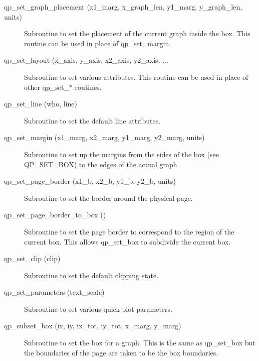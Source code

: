 \begin{description}
\label{r:qp.set.graph.placement}
\item[qp_set_graph_placement (x1_marg, x_graph_len, y1_marg, y_graph_len, units)] \Newline 
Subroutine to set the placement of the current graph inside the box. 
This routine can be used in place of qp_set_margin.

\label{r:qp.set.layout}
\item[qp_set_layout (x_axis, y_axis, x2_axis, y2_axis, ...] \Newline 
     Subroutine to set various attributes. This routine can be used
     in place of other qp_set_* routines.

\label{r:qp.set.line}
\item[qp_set_line (who, line)] \Newline 
     Subroutine to set the default line attributes.

\label{r:qp.set.margin}
\item[qp_set_margin (x1_marg, x2_marg, y1_marg, y2_marg, units)] \Newline 
Subroutine to set up the margins from the sides of the box (see QP_SET_BOX)
to the edges of the actual graph.

\label{r:qp.set.page.border}
\item[qp_set_page_border (x1_b, x2_b, y1_b, y2_b, units)] \Newline 
     Subroutine to set the border around the physical page.

\label{r:qp.set.page.border.to.box}
\item[qp_set_page_border_to_box ()] \Newline 
Subroutine to set the page border to correspond to the region of the
current box. This allows qp_set_box to subdivide the current box.

\label{r:qp.set.clip}
\item[qp_set_clip (clip)] \Newline 
     Subroutine to set the default clipping state.

\label{r:qp.set.parameters}
\item[qp_set_parameters (text_scale)] \Newline 
Subroutine to set various quick plot parameters.

\label{r:qp.subset.box}
\item[qp_subset_box (ix, iy, ix_tot, iy_tot, x_marg, y_marg)] \Newline 
     Subroutine to set the box for a graph. This is the same as
     qp_set_box but the boundaries of the page are taken to be the box boundaries.


\end{description}
